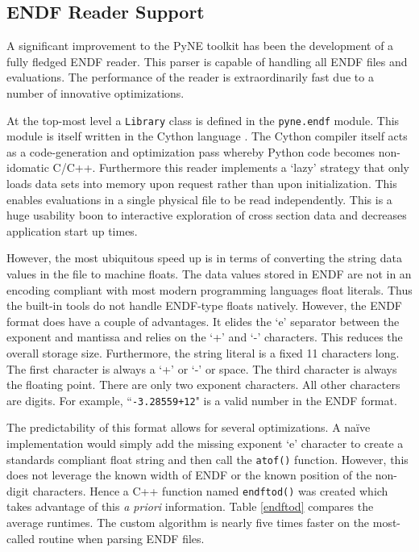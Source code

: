 \documentclass{ansconf}
\begin{document}
\subsection{ENDF Reader Support}

A significant improvement to the PyNE toolkit has been the development of 
a fully fledged ENDF \cite{mclane2001endf} reader.  This parser is capable 
of handling all ENDF files and evaluations. The performance of the reader is 
extraordinarily fast due to a number of innovative optimizations.

At the top-most level a \texttt{Library} class is defined in the \texttt{pyne.endf}
module.  This module is itself written in the Cython language \cite{behnel2010cython}.
The Cython compiler itself acts as a code-generation and optimization pass whereby
Python code becomes non-idomatic C/C++.  Furthermore this reader implements a
`lazy' strategy that only loads data sets into memory upon request rather 
than upon initialization.  This enables evaluations in a single physical file to be 
read independently.  This is a huge usability boon to interactive exploration of 
cross section data and decreases application start up times.

However, the most ubiquitous speed up is in terms of converting the string
data values in the file to machine floats.  The data values stored in ENDF 
are not in an encoding compliant with
most modern programming languages float literals. Thus the built-in tools do not 
handle ENDF-type floats natively.  However, the ENDF format does have a couple
of advantages.  It elides the `e' separator between the exponent and mantissa and
relies on the `+' and `-' characters.  This reduces the overall storage size.
Furthermore, the string literal is a fixed 11 characters long. The first character
is always a `+' or `-' or space.  The third character is always the floating point.
There are only two exponent characters. All other characters are digits.  
For example, ``\texttt{-3.28559+12}" is a valid number in the ENDF format.

The predictability of this format allows for several optimizations.  A na\"{i}ve 
implementation would simply add the missing exponent `e' character to create
a standards compliant float string and then call the \texttt{atof()} function.  
However, this does not leverage the known width of ENDF or the known position of
the non-digit characters.  Hence a C++ function named \texttt{endftod()} was 
created which takes advantage of this \emph{a priori} information.  
Table \ref{endftod} compares the average runtimes. The custom algorithm is nearly 
five times faster on the most-called routine when parsing ENDF files.
\end{document}
